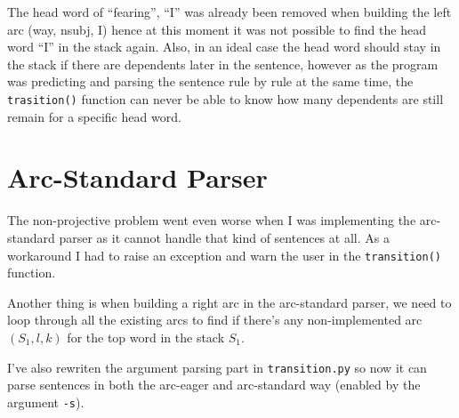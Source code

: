 \documentclass[11pt]{article} %
\begin{document}
The head word of ``fearing'', ``I'' was already been removed when building the left arc (way, nsubj, I) hence at this moment it was not possible to find the head word ``I'' in the stack again. Also, in an ideal case the head word should stay in the stack if there are dependents later in the sentence, however as the program was predicting and parsing the sentence rule by rule at the same time, the \verb|trasition()| function can never be able to know how many dependents are still remain for a specific head word.

\section{Arc-Standard Parser}

The non-projective problem went even worse when I was implementing the arc-standard parser as it cannot handle that kind of sentences at all. As a workaround I had to raise an exception and warn the user in the \verb|transition()| function.

Another thing is when building a right arc in the arc-standard parser, we need to loop through all the existing arcs to find if there's any non-implemented arc $(S_1, l, k)$ for the top word in the stack $S_1$.

I've also rewriten the argument parsing part in \verb|transition.py| so now it can parse sentences in both the arc-eager and arc-standard way (enabled by the argument \verb|-s|).
\end{document}
